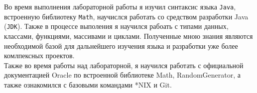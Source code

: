     Во время выполнения лабораторной работы я изучил синтаксис языка \verb|Java|, встроенную библиотеку \verb|Math|, научислся работать со средством разработки Java (\verb|JDK|). Также в процессе выполения я научился рабоать с типами данных, классами, функциями, массивами и циклами. Полученные мною знания являются необходимой базой для дальнейшего изучения языка и разработки уже более комлпексных проектов.\\
    Также во время работы над лабораторной, я научился работать с официальной документацией Oracle по встроенной библиотеке Math\cite{oracledocmath}, RandomGenerator\cite{oracledocrandom}, а также ознакомился с базовыми командами *NIX\cite{gnudoc} и Git\cite{gitdoc}.
    \newpage






